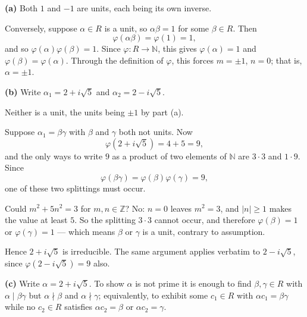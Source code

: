 \documentclass[11pt]{article}
\begin{document}
\begin{solution}
  \textbf{(a)} Both $1$ and $-1$ are units, each being its own inverse.

  Conversely, suppose $\alpha \in R$ is a unit, so $\alpha\beta = 1$ for some
  $\beta \in R$. Then
  \[
    \varphi(\alpha\beta) = \varphi(1) = 1,
  \]
  and so $\varphi(\alpha)\varphi(\beta) = 1$. Since
  $\varphi : R \to \mathbb{N}$, this gives $\varphi(\alpha) = 1$ and
  $\varphi(\beta) = \varphi(\alpha)$. Through the definition of $\varphi$, this
  forces $m = \pm 1$, $n = 0$; that is, $\alpha = \pm 1$.

  \medskip
  \textbf{(b)} Write $\alpha_{1} = 2 + i\sqrt{5}$ and
  $\alpha_{2} = 2 - i\sqrt{5}$.

  Neither is a unit, the units being $\pm 1$ by part (a).

  Suppose $\alpha_{1} = \beta\gamma$ with $\beta$ and $\gamma$ both not units.
  Now
  \[
    \varphi(2 + i\sqrt{5}) = 4 + 5 = 9,
  \]
  and the only ways to write $9$ as a product of two elements of $\mathbb{N}$
  are $3 \cdot 3$ and $1 \cdot 9$. Since
  \[
    \varphi(\beta\gamma) = \varphi(\beta)\varphi(\gamma) = 9,
  \]
  one of these two splittings must occur.

  Could $m^{2} + 5n^{2} = 3$ for $m, n \in \mathbb{Z}$? No: $n = 0$ leaves
  $m^{2} = 3$, and $|n| \geq 1$ makes the value at least $5$. So the splitting
  $3 \cdot 3$ cannot occur, and therefore $\varphi(\beta) = 1$ or
  $\varphi(\gamma) = 1$ --- which means $\beta$ or $\gamma$ is a unit, contrary
  to assumption.

  Hence $2 + i\sqrt{5}$ is irreducible. The same argument applies verbatim to
  $2 - i\sqrt{5}$, since $\varphi(2 - i\sqrt{5}) = 9$ also.

  \medskip
  \textbf{(c)} Write $\alpha = 2 + i\sqrt{5}$. To show $\alpha$ is not prime it
  is enough to find $\beta, \gamma \in R$ with $\alpha \mid \beta\gamma$ but
  $\alpha \nmid \beta$ and $\alpha \nmid \gamma$; equivalently, to exhibit some
  $c_{1} \in R$ with $\alpha c_{1} = \beta\gamma$ while no $c_{2} \in R$
  satisfies $\alpha c_{2} = \beta$ or $\alpha c_{2} = \gamma$.


\end{solution}
\end{document}
